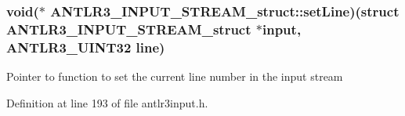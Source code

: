 \hypertarget{struct_a_n_t_l_r3___i_n_p_u_t___s_t_r_e_a_m__struct_a29cecb04980a396b5b7a928f53117bd2}{
\subsubsection[{set\-Line}]{\setlength{\rightskip}{0pt plus 5cm}void($\ast$ A\-N\-T\-L\-R3\-\_\-\-I\-N\-P\-U\-T\-\_\-\-S\-T\-R\-E\-A\-M\-\_\-struct\-::set\-Line)(struct {\bf A\-N\-T\-L\-R3\-\_\-\-I\-N\-P\-U\-T\-\_\-\-S\-T\-R\-E\-A\-M\-\_\-struct} $\ast$input, {\bf A\-N\-T\-L\-R3\-\_\-\-U\-I\-N\-T32} {\bf line})}}\label{struct_a_n_t_l_r3___i_n_p_u_t___s_t_r_e_a_m__struct_a29cecb04980a396b5b7a928f53117bd2}
Pointer to function to set the current line number in the input stream 

Definition at line 193 of file antlr3input.\-h.

